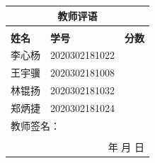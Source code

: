 \documentclass[UTF8,12pt]{ctexart}
\begin{document}
    \begin{table}[H]
    \centering
    \begin{tabular}{|p{4cm}<{\centering}|p{6cm}<{\centering}|p{3cm}<{\centering}|}
    \hline
    \multicolumn{3}{|c|}{\textbf{教师评语}}                                                  \\ \hline
    \multicolumn{3}{|c|}{ \rule{0pt}{60pt} }  \\ \hline
    {\textbf{姓名}} & {\textbf{学号}}   & \textbf{分数} \\ \hline
    \multicolumn{1}{|c|}{李心杨} & \multicolumn{1}{c|}{2020302181022}  &             \\ \hline
    \multicolumn{1}{|c|}{王宇骥} & \multicolumn{1}{c|}{2020302181008} &             \\ \hline
    \multicolumn{1}{|c|}{林锟扬} & \multicolumn{1}{c|}{2020302181032} &             \\ \hline
    \multicolumn{1}{|c|}{郑炳捷} & \multicolumn{1}{c|}{2020302181024} &             \\ \hline
    \multicolumn{3}{|l|}{教师签名：}       \\ 
    \multicolumn{3}{|r|}{} \\ 
    \multicolumn{3}{|r|}{年 \space 月 \space 日} \\ \hline
    \end{tabular}
    \end{table}
\end{document}
